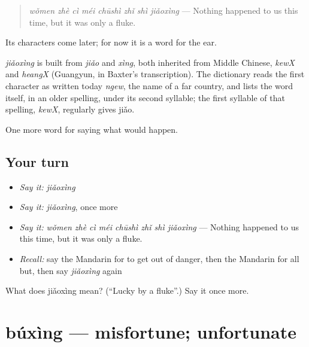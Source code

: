 \begin{quote}
\emph{wǒmen zhè cì méi chūshì zhǐ shì jiǎoxìng} — Nothing happened to us this time, but it was only a fluke.
\end{quote}

Its characters come later; for now it is a word for the ear.

\begin{cousinweb}
\emph{jiǎoxìng} is built from \emph{jiǎo} and \emph{xìng}, both inherited from Middle Chinese, \emph{kewX} and \emph{heangX} (Guangyun, in Baxter's transcription). The dictionary reads the first character as written today \emph{ngew}, the name of a far country, and lists the word itself, in an older spelling, under its second syllable; the first syllable of that spelling, \emph{kewX}, regularly gives jiǎo.
\end{cousinweb}

\begin{grammarlens}[title={What you've built}]
One more word for saying what would happen.
\end{grammarlens}

\subsection*{Your turn}
\begin{itemize}
\raggedright
  \item \emph{Say it:} \emph{jiǎoxìng}
  \item \emph{Say it:} \emph{jiǎoxìng}, once more
  \item \emph{Say it:} \emph{wǒmen zhè cì méi chūshì zhǐ shì jiǎoxìng} — Nothing happened to us this time, but it was only a fluke.
  \item \emph{Recall:} say the Mandarin for to get out of danger, then the Mandarin for all but, then say \emph{jiǎoxìng} again
\end{itemize}

\begin{tcolorbox}[breakable,colback=teal!4,colframe=teal!35!black,title={Before you move on}]
What does jiǎoxìng mean? (\textquotedblleft{}Lucky by a fluke\textquotedblright{}.) Say it once more.
\end{tcolorbox}
\section[búxìng]{búxìng — misfortune; unfortunate}

\label{lesson:ZH-C531-buxing}



